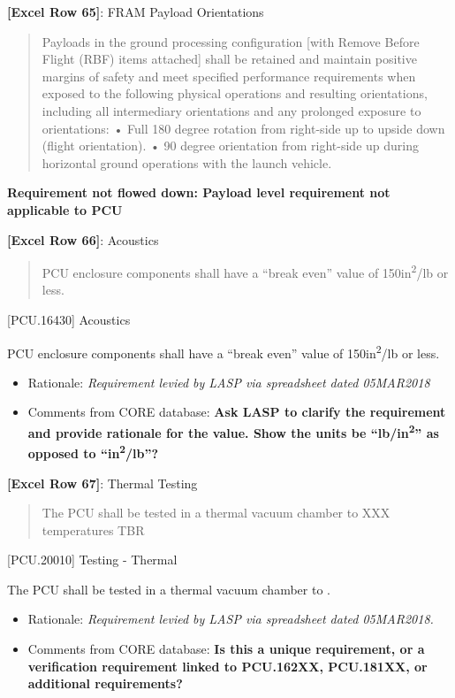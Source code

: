 \textbf{[Excel Row 65]}: FRAM Payload Orientations

\begin{quote}
Payloads in the ground processing configuration [with Remove Before Flight (RBF) items attached] shall be retained and maintain positive margins of safety and meet specified performance requirements when exposed to the following physical operations and resulting orientations, including all intermediary orientations and any prolonged exposure to orientations: • Full 180 degree rotation from right-side up to upside down (flight orientation).
• 90 degree orientation from right-side up during horizontal ground operations with the launch vehicle.
\end{quote}

\textbf{Requirement not flowed down: Payload level requirement not applicable to PCU}

\textbf{[Excel Row 66]}: Acoustics

\begin{quote}
PCU enclosure components shall have a ``break even'' value of 150in\textsuperscript{2}\slash lb or less.
\end{quote}

[PCU.16430] Acoustics

PCU enclosure components shall have a ``break even'' value of 150in\textsuperscript{2}\slash lb or less.

\begin{itemize}
\item{} Rationale: \emph{Requirement levied by LASP via spreadsheet dated 05MAR2018}

\item{} Comments from CORE database: \textbf{Ask LASP to clarify the requirement and provide rationale for the value. Show the units be ``lb\slash in\textsuperscript{2}'' as opposed to ``in\textsuperscript{2}\slash lb''?}

\end{itemize}

\textbf{[Excel Row 67]}: Thermal Testing

\begin{quote}
The PCU shall be tested in a thermal vacuum chamber to XXX temperatures TBR
\end{quote}

[PCU.20010] Testing - Thermal

The PCU shall be tested in a thermal vacuum chamber to .

\begin{itemize}
\item{} Rationale: \emph{Requirement levied by LASP via spreadsheet dated 05MAR2018.}

\item{} Comments from CORE database: \textbf{Is this a unique requirement, or a verification requirement linked to PCU.162XX, PCU.181XX, or additional requirements?}

\end{itemize}

